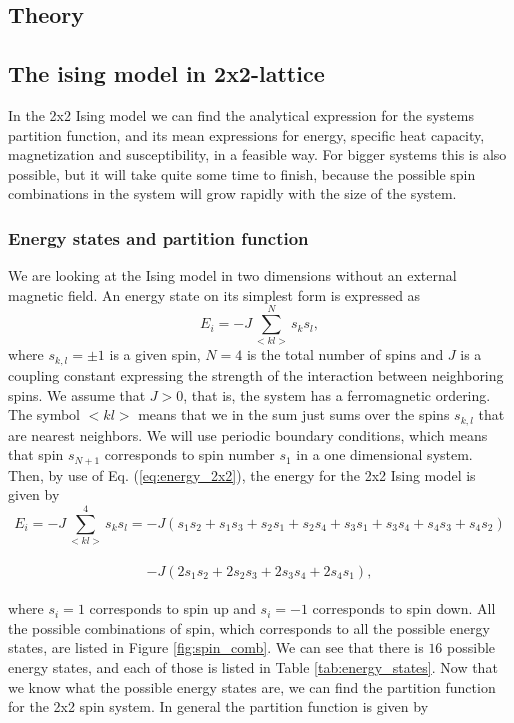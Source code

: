 \documentclass[12pt]{article}
\begin{document}
\begin{flushleft}
\section{Theory}
\subsection{The ising model in 2x2-lattice}
In the 2x2 Ising model  we can find the analytical expression for the systems partition function, and its mean expressions for energy, specific heat capacity, magnetization and susceptibility, in a feasible way. For bigger systems this is also possible, but it will take quite some time to finish, because the possible spin combinations in the system will grow rapidly with the size of the system.  
\subsubsection{Energy states and partition function}
We are looking at the Ising model in two dimensions without an external magnetic field. An energy state on its simplest form is expressed as
\begin{equation}\label{eq:energy_2x2}
E_i = -J\sum\limits_{<kl>}^{N}s_k s_l,
\end{equation}
where $s_{k,l} = \pm1$ is a given spin, $N=4$ is the total number of spins and $J$ is a coupling constant expressing the strength of the interaction between neighboring spins. We assume that $J>0$, that is, the system has a ferromagnetic ordering. The symbol $<kl>$ means that we in the sum just sums over the spins $s_{k,l}$ that are nearest neighbors. We will use periodic boundary conditions, which means that spin $s_{N+1}$ corresponds to spin number $s_1$ in a one dimensional system. Then, by use of Eq. (\ref{eq:energy_2x2}), the energy for the 2x2 Ising model is given by
\vspace{5mm}
$$E_i = -J\sum\limits_{<kl>}^{4}s_k s_l = -J\left(s_1s_2 + s_1s_3+s_2s_1+s_2s_4+s_3s_1+s_3s_4+s_4s_3+s_4s_2\right)$$\\
$$-J\left(2s_1s_2 + 2s_2s_3 + 2s_3s_4 + 2s_4s_1\right),$$\\
\vspace{5mm}
where $s_i = 1$ corresponds to spin up and $s_i = -1$ corresponds to spin down. All the possible combinations of spin, which corresponds to all the possible energy states, are listed in Figure \ref{fig:spin_comb}. We can see that there is $16$ possible energy states, and each of those is listed in Table \ref{tab:energy_states}. Now that we know what the possible energy states are, we can find the partition function for the 2x2 spin system. In general the partition function is given by\\

\end{flushleft}
\end{document}
